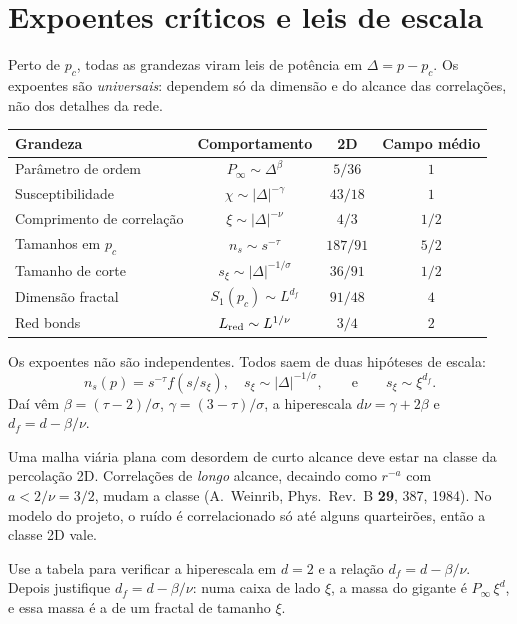 \documentclass[11pt]{article}
\begin{document}
\section{Expoentes críticos e leis de escala}

Perto de $p_c$, todas as grandezas viram leis de potência em $\Delta = p-p_c$. Os expoentes são \emph{universais}: dependem só da dimensão e do alcance das correlações, não dos detalhes da rede.

\begin{center}
\renewcommand{\arraystretch}{1.25}
\begin{tabular}{lccc}
\toprule
Grandeza & Comportamento & 2D & Campo médio \\
\midrule
Parâmetro de ordem & $P_\infty\sim\Delta^\beta$ & $5/36$ & $1$ \\
Susceptibilidade & $\chi\sim|\Delta|^{-\gamma}$ & $43/18$ & $1$ \\
Comprimento de correlação & $\xi\sim|\Delta|^{-\nu}$ & $4/3$ & $1/2$ \\
Tamanhos em $p_c$ & $n_s\sim s^{-\tau}$ & $187/91$ & $5/2$ \\
Tamanho de corte & $s_\xi\sim|\Delta|^{-1/\sigma}$ & $36/91$ & $1/2$ \\
Dimensão fractal & $S_1(p_c)\sim L^{d_f}$ & $91/48$ & $4$ \\
Red bonds & $L_{\rm red}\sim L^{1/\nu}$ & $3/4$ & $2$ \\
\bottomrule
\end{tabular}
\end{center}

\begin{ideia}
Os expoentes não são independentes. Todos saem de duas hipóteses de escala:
\[
n_s(p) = s^{-\tau} f\!\left(s/s_\xi\right),\quad s_\xi \sim |\Delta|^{-1/\sigma},
\qquad\text{e}\qquad s_\xi \sim \xi^{d_f}.
\]
Daí vêm $\beta = (\tau-2)/\sigma$, $\gamma = (3-\tau)/\sigma$, a hiperescala $d\nu = \gamma+2\beta$ e $d_f = d-\beta/\nu$.
\end{ideia}

Uma malha viária plana com desordem de curto alcance deve estar na classe da percolação 2D. Correlações de \emph{longo} alcance, decaindo como $r^{-a}$ com $a < 2/\nu = 3/2$, mudam a classe (A.~Weinrib, Phys.\ Rev.\ B \textbf{29}, 387, 1984). No modelo do projeto, o ruído é correlacionado só até alguns quarteirões, então a classe 2D vale.

 Use a tabela para verificar a hiperescala em $d=2$ e a relação $d_f = d - \beta/\nu$. Depois justifique $d_f = d-\beta/\nu$: numa caixa de lado $\xi$, a massa do gigante é $P_\infty\,\xi^d$, e essa massa é a de um fractal de tamanho $\xi$.
\end{document}
